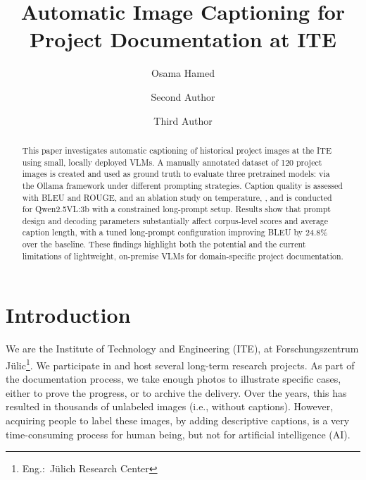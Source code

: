 \documentclass[runningheads]{llncs}
\begin{document}
%
\title{Automatic Image Captioning for Project Documentation at ITE}
%
%
\author{Osama Hamed \and
Second Author \and
Third Author}
%
%
%
\maketitle              %
%
\begin{abstract}
This paper investigates automatic captioning of historical project images at the ITE using small, locally deployed VLMs. 
A manually annotated dataset of 120 project images is created and used as ground truth to evaluate three pretrained models: 
via the Ollama framework under different prompting strategies.
Caption quality is assessed with BLEU and ROUGE, and an ablation study on temperature, , and  is conducted for Qwen2.5VL:3b with a constrained long-prompt setup. Results show that prompt design and decoding parameters substantially affect corpus-level scores and average caption length, with a tuned long-prompt configuration improving BLEU by 24.8\% over the baseline. These findings highlight both the potential and the current limitations of lightweight, on-premise VLMs for domain-specific project documentation.
\end{abstract}

%
% 

\section{Introduction}
We are the Institute of Technology and Engineering (ITE), at Forschungszentrum Jülic\footnote{Eng.:~Jülich Research Center}. We participate in and host several long-term research projects. As part of the documentation process, we take enough photos to illustrate specific cases, either to prove the progress, or to archive the delivery. Over the years, this has resulted in thousands of unlabeled images (i.e., without captions). However, acquiring people to label these images, by adding descriptive captions, is a very time-consuming process for human being, but not for artificial intelligence (AI).
\end{document}

